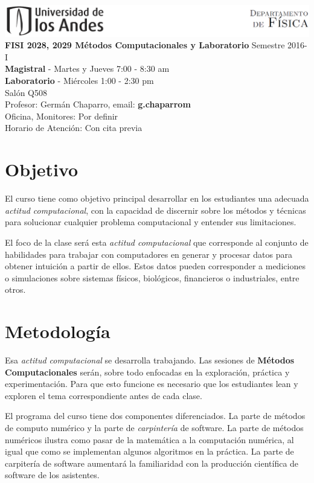 \documentclass[11pt]{article}
\begin{document}
\includegraphics[width=490pt]{header.png}\\[0.5cm]

\noindent
\textbf{FISI 2028, 2029 Métodos Computacionales y Laboratorio} Semestre 2016-I\\
\textbf{Magistral} - Martes y Jueves 7:00 - 8:30 am \\
\textbf{Laboratorio} - Mi\'ercoles 1:00 - 2:30 pm \\
Salón Q508\\
Profesor: Germán Chaparro, email: \textbf{g.chaparrom}\\
Oficina, Monitores: Por definir\\
Horario de Atención: Con cita previa


\section*{Objetivo}
El curso tiene como objetivo principal desarrollar en los
estudiantes una adecuada \emph{actitud computacional}, con la capacidad de
discernir sobre los m\'etodos y t\'ecnicas para solucionar cualquier 
problema computacional y entender sus limitaciones.
 
El foco de la clase ser\'a esta \emph{actitud computacional} que
corresponde al conjunto de habilidades para trabajar con computadores
en generar y procesar datos para obtener intuici\'on a partir de ellos. Estos datos pueden
corresponder a mediciones o simulaciones sobre sistemas f\'isicos,
biol\'ogicos, financieros o industriales, entre otros.  

\section*{Metodolog\'ia}
Esa \emph{actitud computacional} se desarrolla trabajando. Las
sesiones de \textbf{M\'etodos Computacionales} ser\'an, sobre todo 
enfocadas en la exploraci\'on, pr\'actica y experimentaci\'on. Para que esto
funcione es necesario que los estudiantes lean y exploren el tema correspondiente antes de cada clase.

El programa del curso tiene dos componentes diferenciados. La parte de
m\'etodos de computo num\'erico y la parte de
\emph{carpinter\'ia} de software. La parte de m\'etodos num\'ericos
ilustra como pasar de la matem\'atica a la computaci\'on num\'erica,
al igual que como se implementan algunos algoritmos en la pr\'actica. 
La parte de carpiter\'ia de software aumentar\'a la familiaridad con
la producci\'on cient\'ifica de software de los asistentes.
\end{document}

